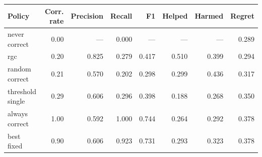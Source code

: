 \begin{tabular}{lrrrrrrr}
\toprule
Policy & Corr. rate & Precision & Recall & F1 & Helped & Harmed & Regret \\
\midrule
never correct & 0.00 & --- & 0.000 & --- & --- & --- & 0.289 \\
rgc & 0.20 & 0.825 & 0.279 & 0.417 & 0.510 & 0.399 & 0.294 \\
random correct & 0.21 & 0.570 & 0.202 & 0.298 & 0.299 & 0.436 & 0.317 \\
threshold single & 0.29 & 0.606 & 0.296 & 0.398 & 0.188 & 0.268 & 0.350 \\
always correct & 1.00 & 0.592 & 1.000 & 0.744 & 0.264 & 0.292 & 0.378 \\
best fixed & 0.90 & 0.606 & 0.923 & 0.731 & 0.293 & 0.323 & 0.378 \\
\bottomrule
\end{tabular}
